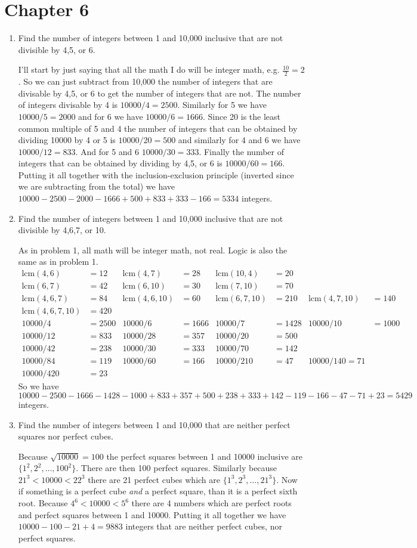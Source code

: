 \documentclass{article}
\begin{document}
\section*{Chapter 6}
\begin{enumerate}
\item
Find the number of integers between 1 and 10,000 inclusive that are not divisible by 4,5, or 6.

I'll start by just saying that all the math I do will be integer math, e.g. $\frac{10}{2}=2$. So we can just subtract from 10,000 the number of integers that are divisable by 4,5, or 6 to get the number of integers that are not. The number of integers divisable by 4 is $10000/4=2500$. Similarly for 5 we have $10000/5=2000$ and for 6 we have $10000/6=1666$. Since 20 is the least common multiple of 5 and 4 the number of integers that can be obtained by dividing 10000 by 4 or 5 is $10000/20=500$ and similarly for 4 and 6 we have $10000/12=833$. And for 5 and 6 $10000/30=333$. Finally the number of integers that can be obtained by dividing by 4,5, or 6 is $10000/60=166$. Putting it all together with the inclusion-exclusion principle (inverted since we are subtracting from the total) we have $10000-2500-2000-1666+500+833+333-166=5334$ integers.
\item
Find the number of integers between 1 and 10,000 inclusive that are not divisible by 4,6,7, or 10.

As in problem 1, all math will be integer math, not real. Logic is also the same as in problem 1.
\begin{align*}
  \text{lcm}(4,6)&=12&\text{lcm}(4,7)&=28&\text{lcm}(10,4)&=20\\
  \text{lcm}(6,7)&=42&\text{lcm}(6,10)&=30&\text{lcm}(7,10)&=70\\
  \text{lcm}(4,6,7)&=84&\text{lcm}(4,6,10)&=60&\text{lcm}(6,7,10)&=210&\text{lcm}(4,7,10)&=140\\
  \text{lcm}(4,6,7,10)&=420\\
  10000/4&=2500&10000/6&=1666&10000/7&=1428&10000/10&=1000\\
  10000/12&=833&10000/28&=357&10000/20&=500\\
  10000/42&=238&10000/30&=333&10000/70&=142\\
  10000/84&=119&10000/60&=166&10000/210&=47&10000/140=71\\
  10000/420&=23
\end{align*}
So we have $10000-2500-1666-1428-1000+833+357+500+238+333+142-119-166-47-71+23=5429$ integers.
\item
Find the number of integers between 1 and 10,000 that are neither perfect squares nor perfect cubes.

Because $\sqrt{10000}=100$ the perfect squares between 1 and 10000 inclusive are $\{1^2,2^2,\dots,100^2\}$. There are then 100 perfect squares. Similarly because $21^3<10000<22^3$ there are 21 perfect cubes which are $\{1^3,2^3,\dots,21^3\}$. Now if something is a perfect cube \emph{and} a perfect square, than it is a perfect sixth root. Because $4^6<10000<5^6$ there are 4 numbers which are perfect roots and perfect squares between 1 and 10000. Putting it all together we have $10000-100-21+4=9883$ integers that are neither perfect cubes, nor perfect squares.
\end{enumerate}
\end{document}
